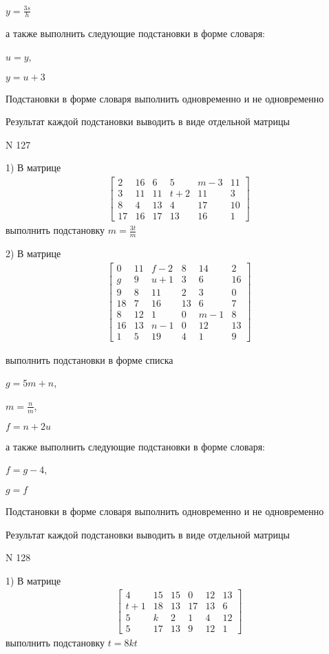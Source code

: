 \documentclass[11pt]{report}
\begin{document}
$y=\frac{3 s}{h}$

а также выполнить следующие подстановки в форме словаря:

$u=y$,

$y=u + 3$


    Подстановки в форме словаря выполнить одновременно и не одновременно


    Результат каждой подстановки выводить в виде отдельной матрицы

\newpage
N 127


    1) В матрице
\begin{align*}
\left[\begin{matrix}2 & 16 & 6 & 5 & m - 3 & 11\\3 & 11 & 11 & t + 2 & 11 & 3\\8 & 4 & 13 & 4 & 17 & 10\\17 & 16 & 17 & 13 & 16 & 1\end{matrix}\right]
\end{align*}
выполнить подстановку $m=\frac{3 t}{m}$


    2) В матрице
\begin{align*}
\left[\begin{matrix}0 & 11 & f - 2 & 8 & 14 & 2\\g & 9 & u + 1 & 3 & 6 & 16\\9 & 8 & 11 & 2 & 3 & 0\\18 & 7 & 16 & 13 & 6 & 7\\8 & 12 & 1 & 0 & m - 1 & 8\\16 & 13 & n - 1 & 0 & 12 & 13\\1 & 5 & 19 & 4 & 1 & 9\end{matrix}\right]
\end{align*}

выполнить подстановки в форме списка

$g=5 m + n$,

$m=\frac{n}{m}$,

$f=n + 2 u$

а также выполнить следующие подстановки в форме словаря:

$f=g - 4$,

$g=f$


    Подстановки в форме словаря выполнить одновременно и не одновременно


    Результат каждой подстановки выводить в виде отдельной матрицы

\newpage
N 128


    1) В матрице
\begin{align*}
\left[\begin{matrix}4 & 15 & 15 & 0 & 12 & 13\\t + 1 & 18 & 13 & 17 & 13 & 6\\5 & k & 2 & 1 & 4 & 12\\5 & 17 & 13 & 9 & 12 & 1\end{matrix}\right]
\end{align*}
выполнить подстановку $t=8 k t$
\end{document}

